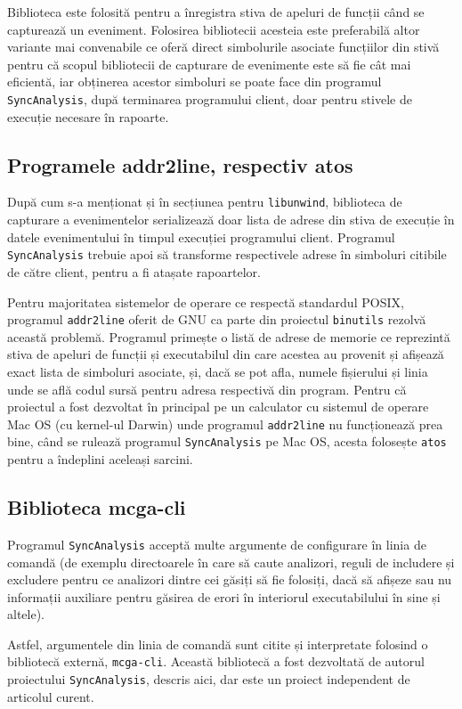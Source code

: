 Biblioteca este folosită pentru a înregistra stiva de apeluri de funcții
când se capturează un eveniment. Folosirea bibliotecii acesteia este
preferabilă altor variante mai convenabile ce oferă direct simbolurile
asociate funcțiilor din stivă pentru că scopul bibliotecii de capturare
de evenimente este să fie cât mai eficientă, iar obținerea acestor
simboluri se poate face din programul \lstinline{SyncAnalysis}, după
terminarea programului client, doar pentru stivele de execuție necesare
în rapoarte.

\subsection{Programele addr2line, respectiv atos}
După cum s-a menționat și în secțiunea pentru \lstinline{libunwind},
biblioteca de capturare a evenimentelor serializează doar lista de
adrese din stiva de execuție în datele evenimentului în timpul execuției
programului client. Programul \lstinline{SyncAnalysis} trebuie apoi să
transforme respectivele adrese în simboluri citibile de către client,
pentru a fi atașate rapoartelor.

Pentru majoritatea sistemelor de operare ce respectă standardul POSIX,
programul \lstinline{addr2line} oferit de GNU ca parte din proiectul
\lstinline{binutils}\cite{binutils} rezolvă această problemă. Programul
primește o listă de adrese de memorie ce reprezintă stiva de apeluri de
funcții și executabilul din care acestea au provenit și afișează exact
lista de simboluri asociate, și, dacă se pot afla, numele fișierului și
linia unde se află codul sursă pentru adresa respectivă din program.
Pentru că proiectul a fost dezvoltat în principal pe un calculator cu
sistemul de operare Mac OS (cu kernel-ul Darwin) unde programul
\lstinline{addr2line} nu funcționează prea bine, când se rulează
programul \lstinline{SyncAnalysis} pe Mac OS, acesta folosește
\lstinline{atos}\cite{atos} pentru a îndeplini aceleași sarcini.

\subsection{Biblioteca mcga-cli}
Programul \lstinline{SyncAnalysis} acceptă multe argumente de
configurare în linia de comandă (de exemplu directoarele în care să
caute analizori, reguli de includere și excludere pentru ce analizori
dintre cei găsiți să fie folosiți, dacă să afișeze sau nu informații
auxiliare pentru găsirea de erori în interiorul executabilului în sine
și altele).

Astfel, argumentele din linia de comandă sunt citite și interpretate
folosind o bibliotecă externă, \lstinline{mcga-cli}\cite{mcga-cli}.
Această bibliotecă a fost dezvoltată de autorul proiectului
\lstinline{SyncAnalysis}, descris aici, dar este un proiect independent
de articolul curent.
